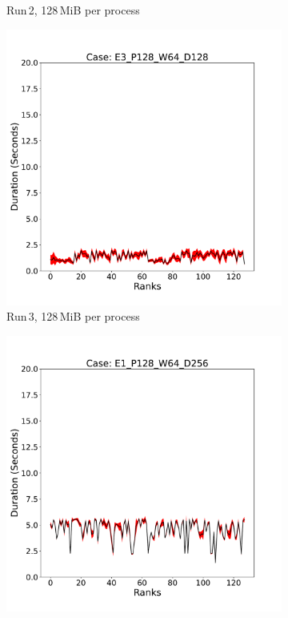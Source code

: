 \begin{figure}
\begin{subfigure}[b]{0.3\textwidth}
         \caption{Run\,2, 128\,MiB per process}
         \label{fig:E2_128_d2}
     \end{subfigure}
      \hfill
     \begin{subfigure}[b]{0.3\textwidth}
         \centering
         \includegraphics[width=\textwidth, height=\textwidth]{figures/deisa2__E3_P128_W64_D128.pdf}
         \caption{Run\,3, 128\,MiB per process}
         \label{fig:E3_128_d2}
     \end{subfigure}
     \vfill
     \begin{subfigure}[b]{0.3\textwidth}
         \centering
         \includegraphics[width=\textwidth, height=\textwidth]{figures/deisa2__E1_P128_W64_D256.pdf}

\end{subfigure}
\end{figure}
